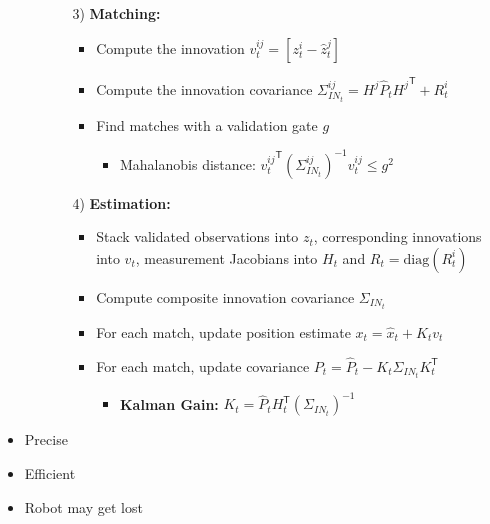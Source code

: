 \documentclass[a4paper]{article}
\newcommand{\ipro}{\item[+]}
\newcommand{\icon}{\item[-]}
\newcommand{\ides}[1]{\item \textbf{#1}}
\newcommand{\transpose}{\mathsf{T}}
\begin{document}
\begin{itemize}
\begin{itemize}
\begin{itemize}
                    \item[3)] \textbf{Matching:}
                        \begin{itemize}
                            \item Compute the innovation $v_t^{ij} = [z_t^i - \hat z_t^j]$
                            \item Compute the innovation covariance $\Sigma_{IN_t}^{ij} = H^j \hat P_t {H^j}^\transpose + R_t^i$
                            \item Find matches with a validation gate $g$
                                \begin{itemize}
                                    \item Mahalanobis distance: ${v_t^{ij}}^\transpose (\Sigma_{IN_t}^{ij})^{-1} v_t^{ij} \le g^2$
                                \end{itemize}
                        \end{itemize}
                    \item[4)] \textbf{Estimation:}
                        \begin{itemize}
                            \item Stack validated observations into $z_t$, corresponding innovations into $v_t$, measurement Jacobians into $H_t$ and $R_t = \mathrm{diag}(R_t^i)$
                            \item Compute composite innovation covariance $\Sigma_{IN_t}$
                            \item For each match, update position estimate $x_t = \hat x_t + K_t v_t$
                            \item For each match, update covariance $P_t = \hat P_t - K_t \Sigma_{IN_t}K_t^\transpose$
                                \begin{itemize}
                                    \ides{Kalman Gain:} $K_t = \hat P_t H_t^\transpose (\Sigma_{IN_t})^{-1}$
                                \end{itemize}
                        \end{itemize}
                \end{itemize}
        \end{itemize}
    \ipro Precise
    \ipro Efficient
    \icon Robot may get lost
\end{itemize}
\end{document}
